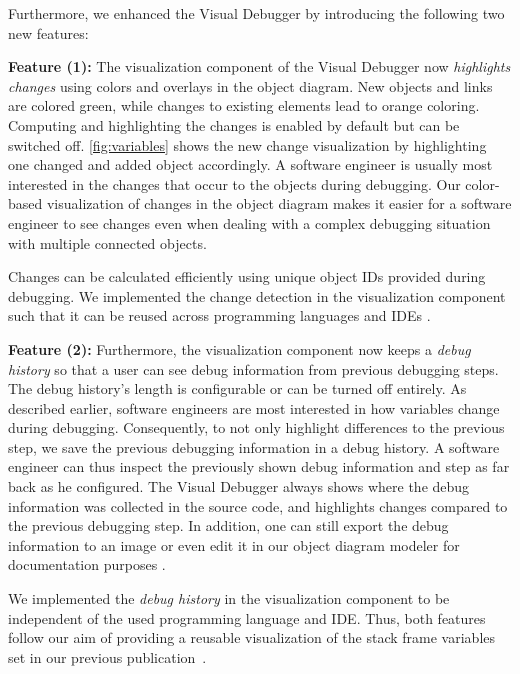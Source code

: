 \documentclass[sigconf]{acmart}
\begin{document}
Furthermore, we enhanced the Visual Debugger by introducing the following two new features:

\textbf{Feature (1):} The visualization component of the Visual Debugger now \textit{highlights changes} using colors and overlays in the object diagram.
New objects and links are colored green, while changes to existing elements lead to orange coloring.
Computing and highlighting the changes is enabled by default but can be switched off.
\autoref{fig:variables} shows the new change visualization by highlighting one changed and added object accordingly.
A software engineer is usually most interested in the changes that occur to the objects during debugging.
Our color-based visualization of changes in the object diagram makes it easier for a software engineer to see changes even when dealing with a complex debugging situation with multiple connected objects.

Changes can be calculated efficiently using unique object IDs provided during debugging.
We implemented the change detection in the visualization component such that it can be reused across programming languages and IDEs \cite{timkrauterICSE2024Artifacts2023}.

\textbf{Feature (2):} Furthermore, the visualization component now keeps a \textit{debug history} so that a user can see debug information from previous debugging steps.
The debug history's length is configurable or can be turned off entirely.
As described earlier, software engineers are most interested in how variables change during debugging.
Consequently, to not only highlight differences to the previous step, we save the previous debugging information in a debug history.
A software engineer can thus inspect the previously shown debug information and step as far back as he configured.
The Visual Debugger always shows where the debug information was collected in the source code, and highlights changes compared to the previous debugging step.
In addition, one can still export the debug information to an image or even edit it in our object diagram modeler \cite{timkrauterObjectdiagramjs2023} for documentation purposes \cite{krauterVisualDebuggerTool2022}.

We implemented the \textit{debug history} in the visualization component to be independent of the used programming language and IDE.
Thus, both features follow our aim of providing a reusable visualization of the stack frame variables set in our previous publication~\cite{krauterVisualDebuggerTool2022}.
\end{document}
